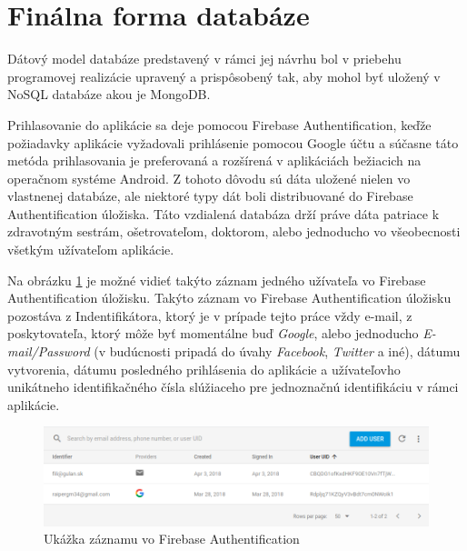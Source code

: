 \section{Finálna forma databáze}
Dátový model databáze predstavený v rámci jej návrhu bol v priebehu programovej realizácie upravený a prispôsobený tak, aby mohol byť uložený v NoSQL databáze akou je MongoDB. 

Prihlasovanie do aplikácie sa deje pomocou Firebase Authentification, keďže požiadavky aplikácie vyžadovali prihlásenie pomocou Google účtu a súčasne táto metóda prihlasovania je preferovaná a rozšírená v aplikáciách bežiacich na operačnom systéme Android. Z tohoto dôvodu sú dáta uložené nielen vo vlastnenej databáze, ale niektoré typy dát boli distribuované do Firebase Authentification úložiska. Táto vzdialená databáza drží práve dáta patriace k zdravotným sestrám, ošetrovateľom, doktorom, alebo jednoducho vo všeobecnosti všetkým užívateľom aplikácie.

Na obrázku \ref{fig:firebase} je možné vidieť takýto záznam jedného užívateľa vo Firebase Authentification úložisku. Takýto záznam vo Firebase Authentification úložisku pozostáva z Indentifikátora, ktorý je v prípade tejto práce vždy e-mail, z poskytovateľa, ktorý môže byť momentálne buď \textit{Google}, alebo jednoducho  \textit{E-mail/Password} (v budúcnosti pripadá do úvahy  \textit{Facebook},  \textit{Twitter} a iné), dátumu vytvorenia, dátumu posledného prihlásenia do aplikácie a užívateľovho unikátneho identifikačného čísla slúžiaceho pre jednoznačnú identifikáciu v rámci aplikácie. 
\begin{figure}[h]
  \centering
  \includegraphics[scale=0.45]{fig/firebase.png}
  \caption{Ukážka záznamu vo Firebase Authentification}
  \label{fig:firebase}
\end{figure}

